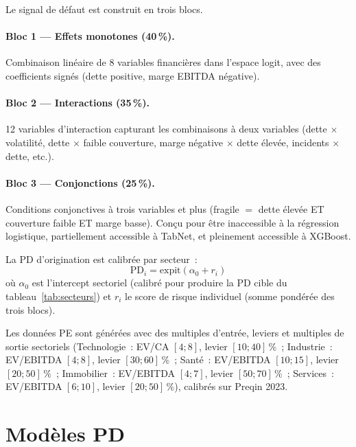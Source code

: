 \documentclass[10pt, a4paper, oneside]{report}
\theoremstyle{definition}
\begin{document}
Le signal de défaut est construit en trois blocs.

\paragraph{Bloc 1 --- Effets monotones (40\,\%).} Combinaison linéaire de 8 variables financières dans l'espace logit, avec des coefficients signés (dette positive, marge EBITDA négative).

\paragraph{Bloc 2 --- Interactions (35\,\%).} 12 variables d'interaction capturant les combinaisons à deux variables (dette $\times$ volatilité, dette $\times$ faible couverture, marge négative $\times$ dette élevée, incidents $\times$ dette, etc.).

\paragraph{Bloc 3 --- Conjonctions (25\,\%).} Conditions conjonctives à trois variables et plus (fragile $=$ dette élevée ET couverture faible ET marge basse). Conçu pour être inaccessible à la régression logistique, partiellement accessible à TabNet, et pleinement accessible à XGBoost.

La PD d'origination est calibrée par secteur~:
\begin{equation}
\text{PD}_i = \text{expit}(\alpha_0 + r_i)
\label{eq:pd_calibration}
\end{equation}
où $\alpha_0$ est l'intercept sectoriel (calibré pour produire la PD cible du tableau~\ref{tab:secteurs}) et $r_i$ le score de risque individuel (somme pondérée des trois blocs).

Les données PE sont générées avec des multiples d'entrée, leviers et multiples de sortie sectoriels (Technologie~: EV/CA $[4;8]$, levier $[10;40]\,\%$~; Industrie~: EV/EBITDA $[4;8]$, levier $[30;60]\,\%$~; Santé~: EV/EBITDA $[10;15]$, levier $[20;50]\,\%$~; Immobilier~: EV/EBITDA $[4;7]$, levier $[50;70]\,\%$~; Services~: EV/EBITDA $[6;10]$, levier $[20;50]\,\%$), calibrés sur Preqin 2023.


\section{Modèles PD}
\label{sec:annexe:pd}
\end{document}

